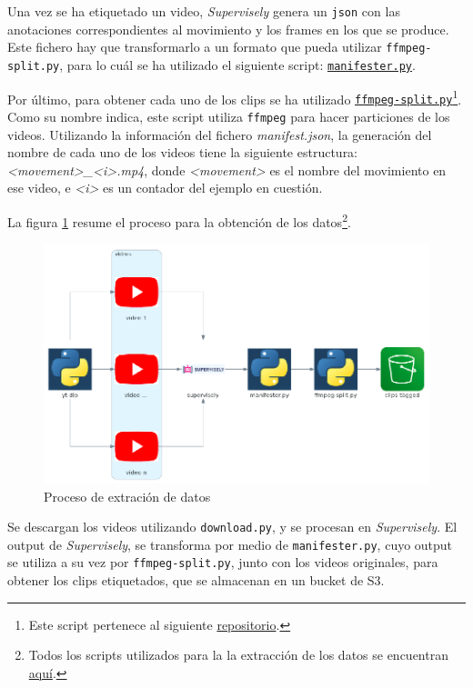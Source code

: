 Una vez se ha etiquetado un video, \textit{Supervisely} genera un \texttt{json} con las anotaciones correspondientes al movimiento y los frames en los que se produce. Este fichero hay que transformarlo a un formato que pueda utilizar \texttt{ffmpeg-split.py}, para lo cuál se ha utilizado el siguiente script: \href{https://github.com/plaguss/tfm-misc/blob/main/scripts/manifester.py}{\texttt{manifester.py}}.

Por último, para obtener cada uno de los clips se ha utilizado \href{https://github.com/plaguss/tfm-misc/blob/main/scripts/ffmpeg-split.py}{\texttt{ffmpeg-split.py}}\footnote{Este script pertenece al siguiente \href{https://github.com/c0decracker/video-splitter}{repositorio}.}. Como su nombre indica, este script utiliza \texttt{ffmpeg} para hacer particiones de los videos. Utilizando la información del fichero  \textit{manifest.json}, la generación del nombre de cada uno de los videos tiene la siguiente estructura: \textit{<movement>\_<i>.mp4}, donde \textit{<movement>} es el nombre del movimiento en ese video, e \textit{<i>} es un contador del ejemplo en cuestión.

La figura \ref{data_extraction_process} resume el proceso para la obtención de los datos\footnote{Todos los scripts utilizados para la la extracción de los datos se encuentran \href{https://github.com/plaguss/tfm-misc/tree/main/scripts}{aquí}.}.

\begin{figure}[H]
    \centering
		\includegraphics[width=\textwidth]{figs/data_extraction_process_.png}
\caption{Proceso de extración de datos}\label{data_extraction_process}
\end{figure}

Se descargan los videos utilizando \texttt{download.py}, y se procesan en \textit{Supervisely}. El output de \textit{Supervisely}, se transforma por medio de \texttt{manifester.py}, cuyo output se utiliza a su vez por \texttt{ffmpeg-split.py}, junto con los videos originales, para obtener los clips etiquetados, que se almacenan en un bucket de S3.

